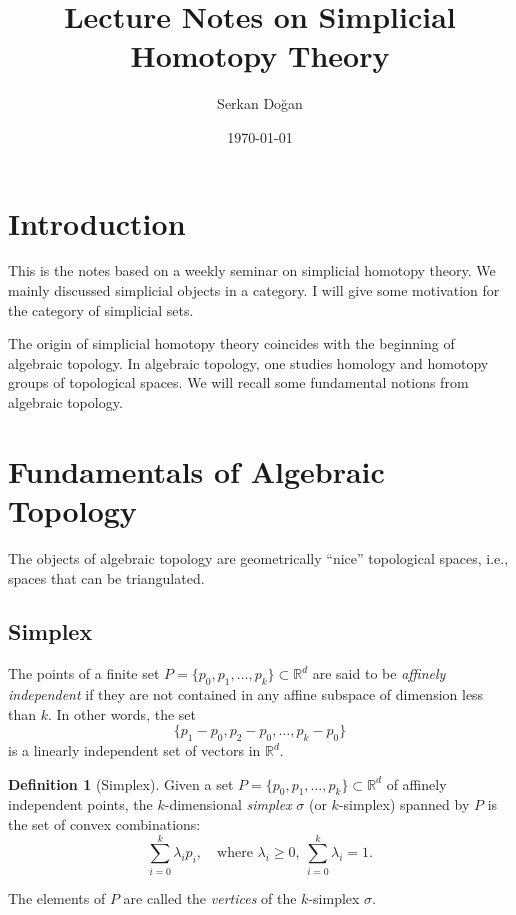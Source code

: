 \documentclass[11pt]{article}
\title{Lecture Notes on Simplicial Homotopy Theory}
\author{Serkan Doğan}
\date{\today}
\theoremstyle{definition}
\newtheorem{definition}{Definition}[section]
\theoremstyle{plain}
\begin{document}
\maketitle

\tableofcontents

\section{Introduction}
This is the notes based on a weekly  seminar on simplicial homotopy theory. We mainly discussed simplicial objects in a category. I will give some motivation for the category of simplicial sets.

The origin of simplicial homotopy theory coincides with the beginning of algebraic topology. In algebraic topology, one studies homology and homotopy groups of topological spaces. We will recall some fundamental notions from algebraic topology.

\section{Fundamentals of Algebraic Topology}

The objects of algebraic topology are geometrically “nice” topological spaces, i.e., spaces that can be triangulated.

\subsection{Simplex }

The points of a finite set $P = \{p_0, p_1, \dots, p_k\} \subset \mathbb{R}^d$ are said to be \emph{affinely independent} if they are not contained in any affine subspace of dimension less than $k$. In other words, the set
\[
    \{p_1 - p_0, p_2 - p_0, \dots, p_k - p_0\}
\]
is a linearly independent set of vectors in $\mathbb{R}^d$.

\begin{definition}[Simplex]
    Given a set $P = \{p_0, p_1, \dots, p_k\} \subset \mathbb{R}^d$ of affinely independent points, the $k$-dimensional \emph{simplex} $\sigma$ (or $k$-simplex) spanned by $P$ is the set of convex combinations:
    \[
        \sum_{i=0}^{k} \lambda_i p_i, \quad \text{where } \lambda_i \geq 0, \ \sum_{i=0}^{k} \lambda_i = 1.
    \]
\end{definition}

The elements of $P$ are called the \emph{vertices} of the $k$-simplex $\sigma$.
\end{document}
